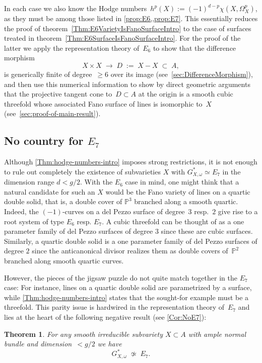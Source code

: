 \documentclass[a4paper]{amsart}
\newcommand{\bbP}{\mathbb{P}}
\newcommand{\iso}{\simeq}
\renewcommand{\ge}{\geqslant}
\theoremstyle{plain}
\newtheorem{theoremintro}{Theorem}
\theoremstyle{definition}
\numberwithin{equation}{section}
\begin{document}
In each case we also know the Hodge numbers~$h^p(X):=(-1)^{d-p}\chi(X, \Omega^p_X)$, as they must be among those listed in \cref{prop:E6,,prop:E7}. This essentially reduces the proof of theorem~\ref{Thm:E6VarietyIsFanoSurfaceIntro} to the case of surfaces treated in theorem~\ref{Thm:E6SurfaceIsFanoSurfaceIntro}. For the proof of the latter we apply the representation theory of~$E_6$ to show that the difference morphism 
%
\[ X\times X \;\longrightarrow\; D \;:=\; X-X \;\subset\; A, \] is generically finite of degree~$\ge 6$ over its image (see~\cref{sec:DifferenceMorphism}), and then use this numerical information to show by direct geometric arguments that the projective tangent cone to~$D\subset A$ at the origin is a smooth cubic threefold whose associated Fano surface of lines is isomorphic to~$X$ (see~\cref{sec:proof-of-main-result}).

\subsection{No country for $E_7$} Although \cref{Thm:hodge-numbers-intro} imposes strong restrictions, it is not enough to rule out completely the existence of subvarieties $X$ with $G_{X, \omega}^\ast \iso E_7$
 in the dimension range $d < g/2$. 
With the $E_6$ case in mind, one might think that a natural candidate for such an $X$ would be the Fano variety of lines on a quartic double solid, that is, a double cover of $\bbP^3$ branched along a smooth quartic. Indeed, the $(-1)$-curves on a del Pezzo surface of degree~$3$ resp.~$2$ give rise to a root system of type $E_6$ resp. $E_7$. A cubic threefold can be thought of as a one parameter family of del Pezzo surfaces of degree $3$ since these are cubic surfaces. Similarly, a quartic double solid is a one parameter family of del Pezzo surfaces of degree $2$ since the anticanonical divisor realizes them as double covers of~$\bbP^2$ branched along smooth quartic curves.\medskip

However, the pieces of the jigsaw puzzle do not quite match together in the $E_7$ case: For instance, lines on a quartic double solid are parametrized by a surface, while \cref{Thm:hodge-numbers-intro} states that the sought-for example must be a threefold. This parity issue is hardwired in the representation theory of~$E_7$ and lies at the heart of the following negative result (see \cref{Cor:NoE7}):


\begin{theoremintro} \label{thmintro:NoE7} For any smooth irreducible subvariety $X\subset A$ with ample normal bundle and dimension~$< g/2$ we have
\[G_{X, \omega}^\ast \; \not \simeq \; E_7.\] 
\end{theoremintro}
\end{document}
